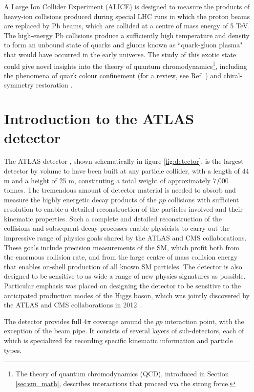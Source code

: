 A Large Ion Collider Experiment (ALICE) \cite{ALICE} is designed to measure the products of heavy-ion collisions produced during special LHC runs in which the proton beams are replaced by Pb beams, which are collided at a centre of mass energy of 5 TeV. The high-energy Pb collisions produce a sufficiently high temperature and density to form an unbound state of quarks and gluons known as ``quark-gluon plasma" that would have occurred in the early universe. The study of this exotic state could give novel insights into the theory of quantum chromodynamics\footnote{The theory of quantum chromodynamics (QCD), introduced in Section \ref{sec:sm_math}, describes interactions that proceed via the strong force.}, including the phenomena of quark colour confinement (for a review, see Ref. \cite{quark_confinement}) and chiral-symmetry restoration \cite{Karsch:845568}.


\section{Introduction to the ATLAS detector}
\label{sec:ATLAS_detector_intro}

The ATLAS detector \cite{atlas}, shown schematically in figure \ref{fig:detector}, is the largest detector by volume to have been built at any particle collider, with a length of 44 m and a height of 25 m, constituting a total weight of approximately 7,000 tonnes. The tremendous amount of detector material is needed to absorb and measure the highly energetic decay products of the \(pp\) collisions with sufficient resolution to enable a detailed reconstruction of the particles involved and their kinematic properties. Such a complete and detailed reconstruction of the collisions and subsequent decay processes enable physicists to carry out the impressive range of physics goals shared by the ATLAS and CMS collaborations. These goals include precision measurements of the SM, which profit both from the enormous collision rate, and from the large centre of mass collision energy that enables on-shell production of all known SM particles. The detector is also designed to be sensitive to as wide a range of new physics signatures as possible. Particular emphasis was placed on designing the detector to be sensitive to the anticipated production modes of the Higgs boson, which was jointly discovered by the ATLAS and CMS collaborations in 2012 \cite{atlas_higgs, cms_higgs}. 

The detector provides full 4\(\pi\) coverage around the \(pp\) interaction point, with the exception of the beam pipe. It consists of several layers of sub-detectors, each of which is specialized for recording specific kinematic information and particle types.

